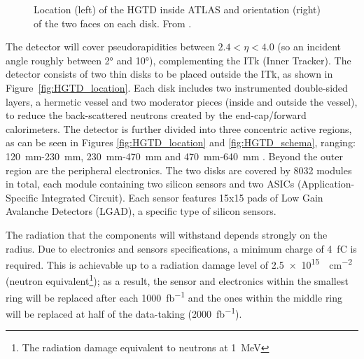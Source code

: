 \begin{figure}[h!tbp]
    \centering
    \hfill
    \centering
    \captionsetup{width=\captionwidth}
    \caption{Location (left) of the HGTD inside ATLAS and orientation (right) of the two faces on each disk. From \cite{cernTechnicalDesign}.}
\end{figure}

The detector will cover pseudorapidities between \(2.4 < \eta < 4.0\) (so an incident angle roughly between 2° and 10°), complementing the ITk (Inner Tracker).
The detector consists of two thin disks to be placed outside the ITk, as shown in Figure~\ref{fig:HGTD_location}. Each disk includes two instrumented double-sided layers, a hermetic vessel and two moderator pieces (inside and outside the vessel), to reduce the back-scattered neutrons created by the end-cap/forward calorimeters. The detector is further divided into three concentric active regions, as can be seen in Figures \ref{fig:HGTD_location} and \ref{fig:HGTD_schema}, ranging: \qty{120}{\milli\meter}-\qty{230}{\milli\meter}, \qty{230}{\milli\meter}-\qty{470}{\milli\meter} and \qty{470}{\milli\meter}-\qty{640}{\milli\meter} \cite{CERN-LHCC-2020-007}. Beyond the outer region are the peripheral electronics.
The two disks are covered by 8032 modules in total, each module containing two silicon sensors and two ASICs (Application-Specific Integrated Circuit). Each sensor features 15x15 pads of Low Gain Avalanche Detectors (LGAD), a specific type of silicon sensors.%

The radiation that the components will withstand depends strongly on the radius. Due to electronics and sensors specifications, a minimum charge of \qty{4}{\femto\coulomb} is required. This is achievable up to a radiation damage level of \qty{2.5e15}{\neutroneq\centi\meter^{-2}} (neutron equivalent\footnote{The radiation damage equivalent to neutrons at \qty{1}{\mega\electronvolt}}); as a result, the sensor and electronics within the smallest ring will be replaced after each \qty{1000}{\femto\barn^{-1}} and the ones within the middle ring will be replaced at half of the data-taking (\qty{2000}{\femto\barn^{-1}}).


